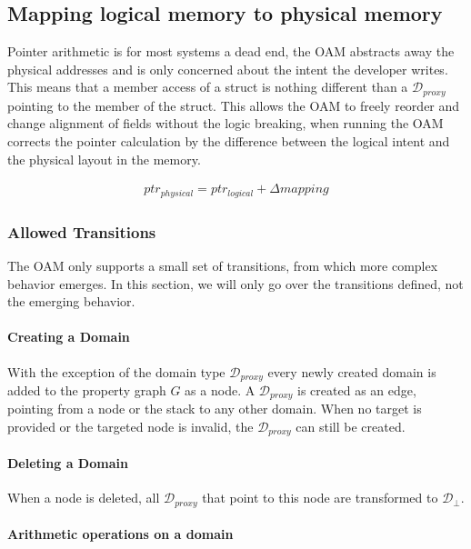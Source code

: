 \documentclass{article}
\begin{document}
    \subsection{Mapping logical memory to physical memory}

    Pointer arithmetic is for most systems a dead end, the OAM abstracts away the physical addresses and is only concerned about the intent the developer writes. This means that a member access of a struct is nothing different than a $\mathcal{D}_{proxy}$ pointing to the member of the struct. This allows the OAM to freely reorder and change alignment of fields without the logic breaking, when running the OAM corrects the pointer calculation by the difference between the logical intent and the physical layout in the memory.

    \begin{gather*}
        ptr_{physical}=ptr_{logical}+\Delta mapping
    \end{gather*}

    \subsubsection{Allowed Transitions}

    The OAM only supports a small set of transitions, from which more complex behavior emerges. In this section, we will only go over the transitions defined, not the emerging behavior.

    \paragraph{Creating a Domain}

    With the exception of the domain type $\mathcal{D}_{proxy}$ every newly created domain is added to the property graph $G$ as a node. A $\mathcal{D}_{proxy}$ is created as an edge, pointing from a node or the stack to any other domain. When no target is provided or the targeted node is invalid, the $\mathcal{D}_{proxy}$ can still be created.

    \paragraph{Deleting a Domain}

    When a node is deleted, all $\mathcal{D}_{proxy}$ that point to this node are transformed to $\mathcal{D}_\bot$.

    \paragraph{Arithmetic operations on a domain}
\end{document}
